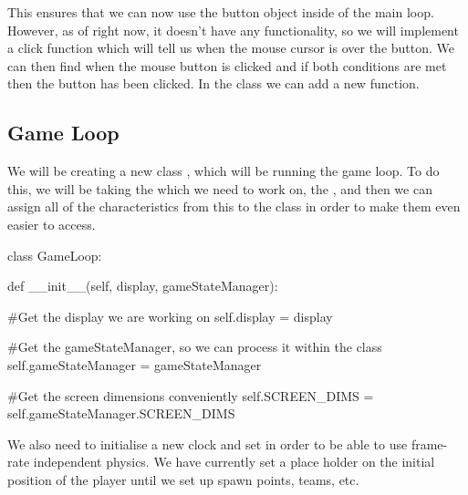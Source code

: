 This ensures that we can now use the button object inside of the main loop. However, as of right now, it doesn't have any functionality, so we will implement a click function which will tell us when the mouse cursor is over the button. We can then find when the mouse button is clicked and if both conditions are met then the button has been clicked. In the  class we can add a new function.




\subsection{Game Loop}

We will be creating a new class , which will be running the game loop. To do this, we will be taking the  which we need to work on, the , and then we can assign all of the characteristics from this to the class in order to make them even easier to access.
\vs
\begin{mpy}
class GameLoop:

    def __init__(self, display, gameStateManager):

        #Get the display we are working on
        self.display = display

        #Get the gameStateManager, so we can process it within the class
        self.gameStateManager = gameStateManager

        #Get the screen dimensions conveniently
        self.SCREEN_DIMS = self.gameStateManager.SCREEN_DIMS
\end{mpy}

\vs
We also need to initialise a new clock and set  in order to be able to use frame-rate independent physics. We have currently set a place holder on the initial position of the player until we set up spawn points, teams, etc.

\vs

